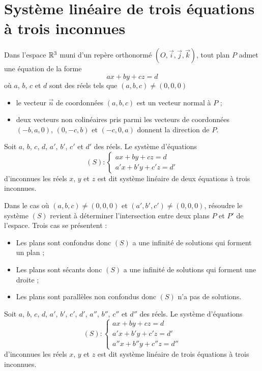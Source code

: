\section{Système linéaire de trois équations à trois inconnues}

\begin{defprop}
	Dans l'espace \(\mathbb{R}^3\) muni d’un repère orthonormé \((O,\vec{i},\vec{j},\vec{k})\), tout plan \(P\) admet une équation de la forme
	\[ax + by + cz = d\]
	où \(a\), \(b\), \(c\) et \(d\) sont des réels tels que \((a,b,c)\neq (0,0,0)\)
	\begin{itemize}
		\item le vecteur \(\vec{n}\) de coordonnées \((a,b,c)\) est un vecteur normal à \(P\) ;
		\item deux vecteurs non colinéaires pris parmi les vecteurs de coordonnées \((-b,a,0)\), \((0,-c,b)\) et \((-c,0,a)\) donnent la direction de \(P\).
	\end{itemize}
\end{defprop}

\begin{defprop}
	Soit \(a\), \(b\), \(c\), \(d\), \(a'\), \(b'\), \(c'\) et \(d'\) des réels. Le système d’équations
	\[
		(S) :
		\begin{cases}
			ax + by + cz = d \\
			a'x + b'y + c'z = d'
		\end{cases}
	\]
	d’inconnues les réels \(x\), \(y\) et \(z\) est dit système linéaire de deux équations à trois inconnues.
\end{defprop}

\begin{defprop}
	Dans le cas où \((a,b,c)\neq (0,0,0)\) et \((a',b',c')\neq (0,0,0)\), résoudre le système \((S)\) revient à déterminer l’intersection entre deux plans \(P\) et \(P'\) de l’espace.
	Trois cas se présentent :
	\begin{itemize}
		\item Les plans sont confondus donc \((S)\) a une infinité de solutions qui forment un plan ;
		\item Les plans sont sécants donc \((S)\) a une infinité de solutions qui forment une droite ;
		\item Les plans sont parallèles non confondus donc \((S)\) n’a pas de solutions.
	\end{itemize}
\end{defprop}
\begin{defprop}
	Soit \(a\), \(b\), \(c\), \(d\), \(a'\), \(b'\), \(c'\), \(d'\), \(a''\), \(b''\), \(c''\) et \(d''\) des réels. Le système d’équations
	\[ (S) : \begin{cases}
			ax + by + cz = d     \\
			a'x + b'y + c'z = d' \\
			a''x + b''y + c''z = d''
		\end{cases} \]
	d’inconnues les réels \(x\), \(y\) et \(z\) est dit système linéaire de trois équations à trois inconnues.
\end{defprop}

